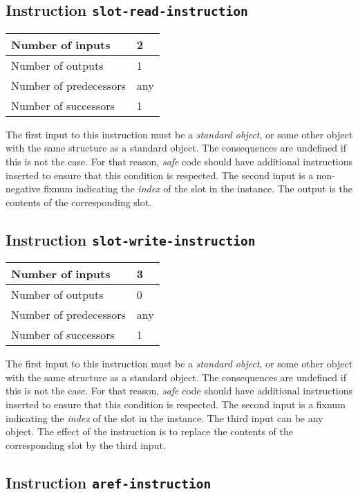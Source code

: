 \subsection{Instruction \texttt{slot-read-instruction}}
\label{hir-instruction-slot-read}

\begin{tabular}{|l|l|}
\hline
Number of inputs & 2\\
\hline
Number of outputs & 1\\
\hline
Number of predecessors & any\\
\hline
Number of successors & 1\\
\hline
\end{tabular}

The first input to this instruction must be a \emph{standard object},
or some other object with the same structure as a standard object.
The consequences are undefined if this is not the case.  For that
reason, \emph{safe} code should have additional instructions inserted
to ensure that this condition is respected.  The second input is a
non-negative fixnum indicating the \emph{index} of the slot in the
instance.  The output is the contents of the corresponding slot.

\subsection{Instruction \texttt{slot-write-instruction}}
\label{hir-instruction-slot-write}

\begin{tabular}{|l|l|}
\hline
Number of inputs & 3\\
\hline
Number of outputs & 0\\
\hline
Number of predecessors & any\\
\hline
Number of successors & 1\\
\hline
\end{tabular}

The first input to this instruction must be a \emph{standard object},
or some other object with the same structure as a standard object.
The consequences are undefined if this is not the case.  For that
reason, \emph{safe} code should have additional instructions inserted
to ensure that this condition is respected.  The second input is a
fixnum indicating the \emph{index} of the slot in the instance.  The
third input can be any object.  The effect of the instruction is to
replace the contents of the corresponding slot by the third input.

\subsection{Instruction \texttt{aref-instruction}}
\label{hir-instruction-aref}

